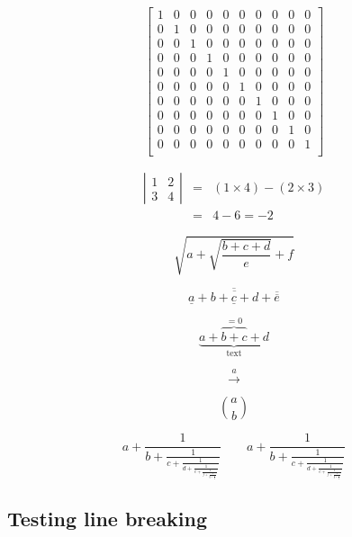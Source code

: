 \documentclass[12pt,a4paper,onecolumn]{article}
\begin{document}
\[
\left[\begin{array}{*{10}{c}} 
1 & 0 & 0 & 0 & 0 & 0 & 0 & 0 & 0 & 0 \\
0 & 1 & 0 & 0 & 0 & 0 & 0 & 0 & 0 & 0 \\
0 & 0 & 1 & 0 & 0 & 0 & 0 & 0 & 0 & 0 \\
0 & 0 & 0 & 1 & 0 & 0 & 0 & 0 & 0 & 0 \\ 
0 & 0 & 0 & 0 & 1 & 0 & 0 & 0 & 0 & 0 \\ 
0 & 0 & 0 & 0 & 0 & 1 & 0 & 0 & 0 & 0 \\ 
0 & 0 & 0 & 0 & 0 & 0 & 1 & 0 & 0 & 0 \\ 
0 & 0 & 0 & 0 & 0 & 0 & 0 & 1 & 0 & 0 \\ 
0 & 0 & 0 & 0 & 0 & 0 & 0 & 0 & 1 & 0 \\ 
0 & 0 & 0 & 0 & 0 & 0 & 0 & 0 & 0 & 1 \\ 
\end{array}\right]
\]

\begin{eqnarray*}
\left|\begin{array}{cc} 1 & 2\\ 3 & 4\end{array}\right| &=& (1\times 4) - (2 \times 3)\\
&=& 4-6 = -2
\end{eqnarray*}

\[
\sqrt{a + \sqrt{\frac{b + c + d}{e}} + f}
\]

\[
\overline{\underline{a} + \overline{b + \underline{c} + d} + \overline{\overline{e}}}
\]

\[
\underbrace{a + \overbrace{b + c}^{=0} + d}_{\mbox{text}}
\]

\[
\stackrel{a}{\longrightarrow}
\]

\[
{a \choose b}
\]

\[
a + \frac{1}{b + \frac{1}{c + \frac{1}{d + \frac{1}{e + \frac{1}{f + \frac{1}{g + \frac{1}{h}}}}}}} \qquad a + \frac{1}{\displaystyle b + \frac{1}{\displaystyle c + \frac{1}{\displaystyle d + \frac{1}{\displaystyle e + \frac{1}{\displaystyle f + \frac{1}{\displaystyle g + \frac{1}{h}}}}}}}
\]

\subsection{Testing line breaking}
\end{document}
